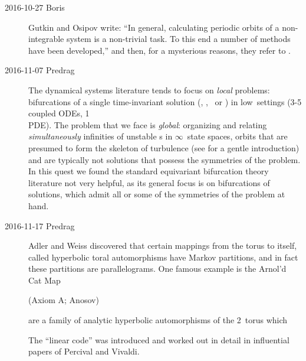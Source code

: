 \begin{description}
\item[2016-10-27 Boris]
Gutkin and Osipov write:
``In general, calculating periodic orbits of a  non-integrable  system  is a
non-trivial  task.   To  this  end  a  number  of  methods have  been
developed,'' and then,  for a mysterious reasons, they refer to
.


\item[2016-11-07 Predrag]

The dynamical systems literature tends to focus on \emph{local} problems:
bifurcations of a single time-invariant solution (\eqv, \reqv, \po\ or
\rpo) in low\dmn\ settings (3-5 coupled ODEs, 1\dmn\\ PDE).
The problem that we face is \emph{global}: organizing and relating
\emph{simultaneously} infinities of unstable \rpo s in
$\infty$\dmn\ state spaces, orbits that are presumed to form the
skeleton of turbulence (see  for a gentle
introduction) and are typically not solutions that possess the symmetries
of the problem. In this quest we found the standard equivariant
bifurcation theory literature not very helpful, as its general focus is
on bifurcations of solutions, which admit all or some of the symmetries
of the problem at hand.

\item[2016-11-17 Predrag]
Adler and Weiss discovered that certain  mappings  from  the
torus  to  itself,  called hyperbolic  toral  automorphisms have  Markov
partitions,  and  in  fact  these  partitions  are  parallelograms. One
famous example is the Arnol'd Cat Map

(Axiom A; Anosov)

are a family of analytic hyperbolic
automorphisms of the  2\dmn\  torus which

The ``linear code'' was introduced and worked out in detail in
influential papers of Percival and Vivaldi.


\end{description}

